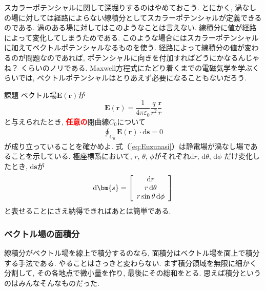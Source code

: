スカラーポテンシャルに関して深堀りするのはやめておこう. 
とにかく, 渦なしの場に対しては経路によらない線積分としてスカラーポテンシャルが定義できるのである. 
渦のある場に対してはこのようなことは言えない. 線積分に値が経路によって変化してしまうためである. 
このような場合にはスカラーポテンシャルに加えてベクトルポテンシャルなるものを使う. 
経路によって線積分の値が変わるのが問題なのであれば, 
ポテンシャルに向きを付加すればどうにかなるんじゃね？ くらいのノリである. 
Maxwell方程式にたどり着くまでの電磁気学を学ぶくらいでは, ベクトルポテンシャルはとりあえず必要になることもないだろう. 

\begin{itembox}[l]{課題}
ベクトル場$\bm{E}(\bm{r})$が
$$
\bm{E}(\bm{r}) = \frac{1}{4 \pi \varepsilon_0} \frac{q}{r^2} \frac{\bm{r}}{r}
$$
と与えられたとき, \textbf{\textcolor{red}{任意の}}閉曲線$C_0$について
\begin{eqnarray}
\oint_{C_0} \bm{E}(\bm{r}) \cdot \mathrm{d}\bm{s} = 0
\label{eq:Euzunasi}
\end{eqnarray}
が成り立っていることを確かめよ. 式（\ref{eq:Euzunasi}）は静電場が渦なし場であることを示している. 
極座標系において, $r$, $\theta$, $\phi$がそれぞれ$\mathrm{d}r$, $\mathrm{d}\theta$, $\mathrm{d}\phi$
だけ変化したとき, $\mathrm{d}\bm{s}$が
$$
\mathrm{d}\bm{s} = \left[
\renewcommand{\arraystretch}{1}
\begin{array}{c}
\mathrm{d}r \\
r \, \mathrm{d}\theta \\
r \sin \theta \, \mathrm{d} \phi
\end{array}
\right]
$$
と表せることにさえ納得できればあとは簡単である. 
\end{itembox}
\subsubsection{ベクトル場の面積分}
線積分がベクトル場を線上で積分するのなら, 面積分はベクトル場を面上で積分する手法である. 
やることはさっきと変わらない. まず積分領域を無限に細かく分割して, 
その各地点で微小量を作り, 最後にその総和をとる. 思えば積分というのはみんなそんなものだった. 

